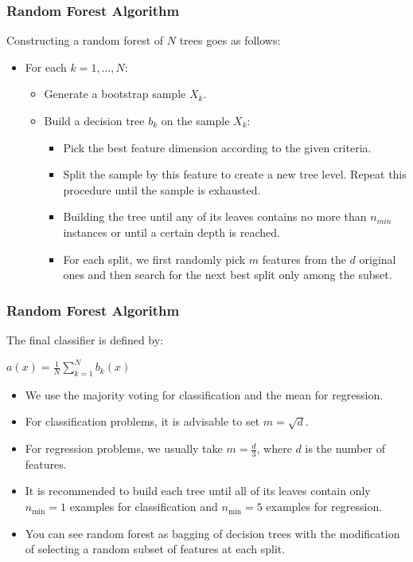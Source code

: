 \begin{frame}[fragile]\frametitle{Random Forest Algorithm}
Constructing a random forest of $N$ trees goes as follows:
\begin{itemize}
\item For each $k = 1, \dots, N$:
\begin{itemize}
\item  Generate a bootstrap sample $X_k$.
\item  Build a decision tree $b_k$ on the sample $X_k$:
\begin{itemize}
\item Pick the best feature dimension according to the given criteria. 
\item Split the sample by this feature to create a new tree level. Repeat this procedure until the sample is exhausted.
\item Building the tree until any of its leaves contains no more than $n_{min}$ instances or until a certain depth is reached.
\item For each split, we first randomly pick $m$ features from the $d$ original ones and then search for the next best split only among the subset.
\end{itemize}
\end{itemize}
\end{itemize}
\end{frame}


\begin{frame}[fragile]\frametitle{Random Forest Algorithm}
The final classifier is defined by:

$a(x) = \frac{1}{N}\sum_{k = 1}^N b_k(x)$

\begin{itemize}
\item We use the majority voting for classification and the mean for regression.
\item For classification problems, it is advisable to set $m = \sqrt{d}$. 
\item For regression problems, we usually take $m = \frac{d}{3}$, where $d$ is the number of features. \item It is recommended to build each tree until all of its leaves contain only $ n_\text{min} = 1$ examples for classification and $n_\text{min} = 5$ examples for regression.
\item You can see random forest as bagging of decision trees with the modification of selecting a random subset of features at each split.
\end{itemize}

\end{frame}


